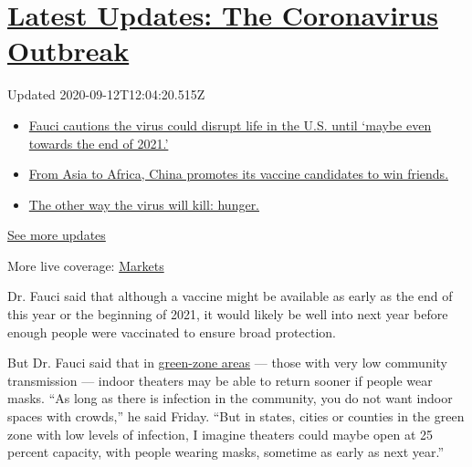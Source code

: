 \hypertarget{latest-updates-the-coronavirus-outbreak}{%
\section{\texorpdfstring{\href{https://www.nytimes3xbfgragh.onion/2020/09/11/world/covid-19-coronavirus.html?action=click\&pgtype=Article\&state=default\&region=MAIN_CONTENT_1\&context=storylines_live_updates}{Latest
Updates: The Coronavirus
Outbreak}}{Latest Updates: The Coronavirus Outbreak}}\label{latest-updates-the-coronavirus-outbreak}}

Updated 2020-09-12T12:04:20.515Z

\begin{itemize}
\tightlist
\item
  \href{https://www.nytimes3xbfgragh.onion/2020/09/11/world/covid-19-coronavirus.html?action=click\&pgtype=Article\&state=default\&region=MAIN_CONTENT_1\&context=storylines_live_updates\#link-dfb8a16}{Fauci
  cautions the virus could disrupt life in the U.S. until `maybe even
  towards the end of 2021.'}
\item
  \href{https://www.nytimes3xbfgragh.onion/2020/09/11/world/covid-19-coronavirus.html?action=click\&pgtype=Article\&state=default\&region=MAIN_CONTENT_1\&context=storylines_live_updates\#link-7104d154}{From
  Asia to Africa, China promotes its vaccine candidates to win friends.}
\item
  \href{https://www.nytimes3xbfgragh.onion/2020/09/11/world/covid-19-coronavirus.html?action=click\&pgtype=Article\&state=default\&region=MAIN_CONTENT_1\&context=storylines_live_updates\#link-393ad215}{The
  other way the virus will kill: hunger.}
\end{itemize}

\href{https://www.nytimes3xbfgragh.onion/2020/09/11/world/covid-19-coronavirus.html?action=click\&pgtype=Article\&state=default\&region=MAIN_CONTENT_1\&context=storylines_live_updates}{See
more updates}

More live coverage:
\href{https://www.nytimes3xbfgragh.onion/live/2020/09/11/business/stock-market-today-coronavirus?action=click\&pgtype=Article\&state=default\&region=MAIN_CONTENT_1\&context=storylines_live_updates}{Markets}

Dr. Fauci said that although a vaccine might be available as early as
the end of this year or the beginning of 2021, it would likely be well
into next year before enough people were vaccinated to ensure broad
protection.

But Dr. Fauci said that in
\href{https://www.npr.org/sections/health-shots/2020/07/01/885263658/green-yellow-orange-or-red-this-new-tool-shows-covid-19-risk-in-your-county}{green-zone
areas} --- those with very low community transmission --- indoor
theaters may be able to return sooner if people wear masks. ``As long as
there is infection in the community, you do not want indoor spaces with
crowds,'' he said Friday. ``But in states, cities or counties in the
green zone with low levels of infection, I imagine theaters could maybe
open at 25 percent capacity, with people wearing masks, sometime as
early as next year.''

